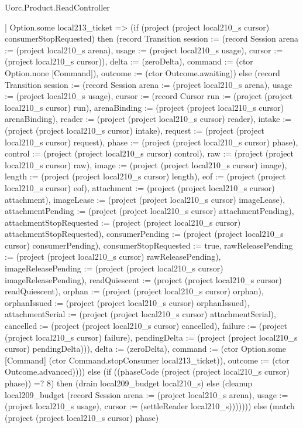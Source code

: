 \begin{lexlean}{Uorc.Product.ReadController}
\begin{semanticmodule}
{    | Option.some local213_ticket => (if (project (project local210_s cursor) consumerStopRequested) then (record Transition {session := (record Session {arena := (project local210_s arena), usage := (project local210_s usage), cursor := (project local210_s cursor)}), delta := (zeroDelta), command := (ctor Option.none [Command]), outcome := (ctor Outcome.awaiting)}) else (record Transition {session := (record Session {arena := (project local210_s arena), usage := (project local210_s usage), cursor := (record Cursor {run := (project (project local210_s cursor) run), arenaBinding := (project (project local210_s cursor) arenaBinding), reader := (project (project local210_s cursor) reader), intake := (project (project local210_s cursor) intake), request := (project (project local210_s cursor) request), phase := (project (project local210_s cursor) phase), control := (project (project local210_s cursor) control), raw := (project (project local210_s cursor) raw), image := (project (project local210_s cursor) image), length := (project (project local210_s cursor) length), eof := (project (project local210_s cursor) eof), attachment := (project (project local210_s cursor) attachment), imageLease := (project (project local210_s cursor) imageLease), attachmentPending := (project (project local210_s cursor) attachmentPending), attachmentStopRequested := (project (project local210_s cursor) attachmentStopRequested), consumerPending := (project (project local210_s cursor) consumerPending), consumerStopRequested := true, rawReleasePending := (project (project local210_s cursor) rawReleasePending), imageReleasePending := (project (project local210_s cursor) imageReleasePending), readQuiescent := (project (project local210_s cursor) readQuiescent), orphan := (project (project local210_s cursor) orphan), orphanIssued := (project (project local210_s cursor) orphanIssued), attachmentSerial := (project (project local210_s cursor) attachmentSerial), cancelled := (project (project local210_s cursor) cancelled), failure := (project (project local210_s cursor) failure), pendingDelta := (project (project local210_s cursor) pendingDelta)})}), delta := (zeroDelta), command := (ctor Option.some [Command] (ctor Command.stopConsumer local213_ticket)), outcome := (ctor Outcome.advanced)}))) else (if ((phaseCode (project (project local210_s cursor) phase)) =? 8) then (drain local209_budget local210_s) else (cleanup local209_budget (record Session {arena := (project local210_s arena), usage := (project local210_s usage), cursor := (settleReader local210_s)})))))) else (match (project (project local210_s cursor) phase)
}
\end{semanticmodule}
\end{lexlean}
